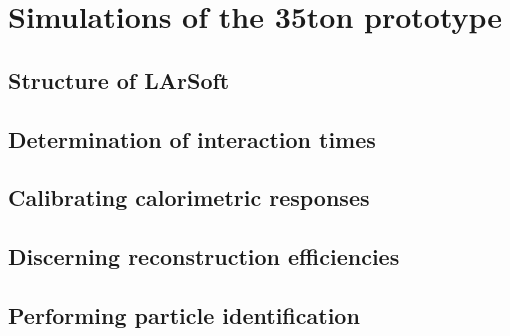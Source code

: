 
\chapter{Simulations of the 35ton prototype}  %

\ifpdf
    \graphicspath{{35tonSimulation/Figs/Raster/}{35tonSimulation/Figs/PDF/}{35tonSimulation/Figs/}}
\else
    \graphicspath{{35tonSimulation/Figs/Vector/}{35tonSimulation/Figs/}}
\fi

\section{Structure of LArSoft} %

\section{Determination of interaction times} %

\section{Calibrating calorimetric responses}  %

\section{Discerning reconstruction efficiencies}  %

\section{Performing particle identification}  %

